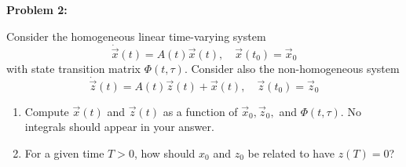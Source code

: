 \documentclass[12pt]{article}
\newenvironment{problem}[1]{
    \textbf{Problem #1:}
}{
    \rmfamily \vspace{1em}
}
\begin{document}
\newpage

\begin{problem}{2}
    Consider the homogeneous linear time-varying system
    \[
        \dot{\vec{x}}(t) = A(t)\vec{x}(t), \quad \vec{x}(t_0) = \vec{x}_0
    \]
    with state transition matrix \(\Phi(t,\tau)\). Consider also the non-homogeneous system
    \[
        \dot{\vec{z}}(t) = A(t)\vec{z}(t) + \vec{x}(t), \quad \vec{z}(t_0) = \vec{z}_0
    \]
    \begin{enumerate}[label=\alph*)]
        \item Compute \(\vec{x}(t)\) and \(\vec{z}(t)\) as a function of \(\vec{x}_0, \vec{z}_0,\) and \(\Phi(t,\tau)\). No integrals should appear in your answer.
        \item For a given time \(T > 0\), how should \(x_0\) and \(z_0\) be related to have \(z(T) = 0\)?
    \end{enumerate}
\end{problem}
\end{document}
